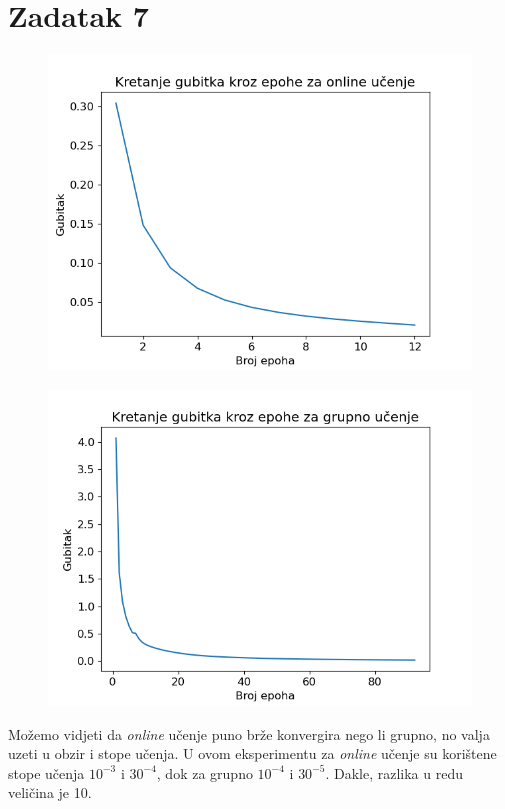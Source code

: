 \documentclass[times, utf8, seminar]{fer}
\begin{document}
\chapter{Zadatak 7}
\begin{figure}[H]
    \centering
    \includegraphics[scale=0.5]{img/loss-online.png}
    \caption{}
\end{figure}
\begin{figure}[H]
    \centering
    \includegraphics[scale=0.5]{img/loss-grupno.png}
    \caption{}
\end{figure}
Možemo vidjeti da \textit{online} učenje puno brže konvergira nego li grupno, no valja uzeti u obzir i stope učenja. U ovom eksperimentu za \textit{online} učenje su korištene stope učenja $10^{-3}$ i $30^{-4}$, dok za grupno $10^{-4}$ i $30^{-5}$. Dakle, razlika u redu veličina je 10.
\end{document}
